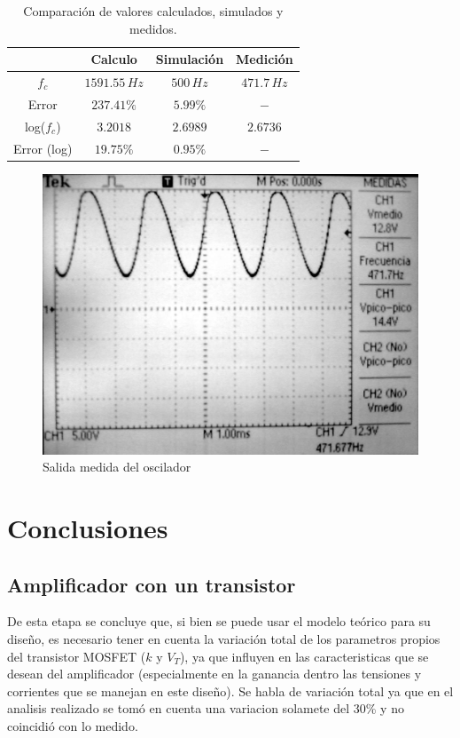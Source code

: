 \documentclass[10pt,spanish,a4paper,notitlepage]{article}
\begin{document}
\begin{table}[H]
\centering
\begin{tabular}{|c|c|c|c|} 
\hline

 & Calculo & Simulación & Medición \\ \hline
$f_c$ & $1591.55\,\unit{Hz}$ & $500\,\unit{Hz}$ & $471.7\,\unit{Hz}$\\ \hline
Error & $237.41\%$ & $5.99\%$ & $-$\\ \hline
log($f_c$) & $3.2018$ & $2.6989$ & $2.6736$\\ \hline
Error (log) & $19.75\%$ & $0.95\%$ & $-$ \\ \hline

\end{tabular}
\caption{Comparación de valores calculados, simulados y medidos.}
\label{table:5_comparacion_mediciones}
\end{table}


\begin{figure}[H]
\centering
\includegraphics[scale=0.1]{mediciones/5_salida.jpg}
\caption{Salida medida del oscilador}
\label{fig:5_salida_med}
\end{figure}


\section{Conclusiones}

\subsection{Amplificador con un transistor}
De esta etapa se concluye que, si bien se puede usar el modelo teórico para su diseño, es necesario tener en cuenta la variación total de los parametros propios del transistor MOSFET ($k$ y $V_T$), ya que influyen en las caracteristicas que se desean del amplificador (especialmente en la ganancia dentro las tensiones y corrientes que se manejan en este diseño). Se habla de variación total ya que en el analisis realizado se tomó en cuenta una variacion solamete del 30\% y no coincidió con lo medido.
\end{document}
